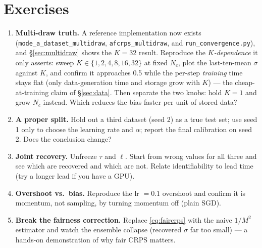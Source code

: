 \documentclass[11pt]{article}
\newcommand{\code}[1]{\texttt{#1}}
\begin{document}
\section{Exercises}
\begin{enumerate}
\item\label{ex:multidraw} \textbf{Multi-draw truth.} A reference implementation
  now exists (\code{mode\_a\_dataset\_multidraw}, \code{afcrps\_multidraw}, and
  \code{run\_convergence.py}), and \S\ref{sec:multidraw} shows the $K{=}32$ result.
  Reproduce the \emph{$K$-dependence} it only asserts: sweep $K\in\{1,2,4,8,16,32\}$
  at fixed $N_c$, plot the last-ten-mean $\sigma$ against $K$, and confirm it
  approaches 0.5 while the per-step \emph{training} time stays flat (only
  data-generation time and storage grow with $K$) --- the cheap-at-training claim
  of \S\ref{sec:data}. Then separate the two knobs: hold $K{=}1$ and grow $N_c$
  instead. Which reduces the bias faster per unit of stored data?
\item\label{ex:cv} \textbf{A proper split.} Hold out a third dataset (seed 2) as a
  true test set; use seed 1 only to choose the learning rate and $\alpha$; report
  the final calibration on seed 2. Does the conclusion change?
\item \textbf{Joint recovery.} Unfreeze $\tau$ and $\ell$. Start from wrong values
  for all three and see which are recovered and which are not. Relate identifiability
  to lead time (try a longer lead if you have a GPU).
\item \textbf{Overshoot vs.\ bias.} Reproduce the lr $=0.1$ overshoot and confirm
  it is momentum, not sampling, by turning momentum off (plain SGD).
\item \textbf{Break the fairness correction.} Replace \eqref{eq:faircrps} with the
  naive $1/M^2$ estimator and watch the ensemble collapse (recovered $\sigma$ far
  too small) --- a hands-on demonstration of why fair CRPS matters.
\end{enumerate}

\end{document}
